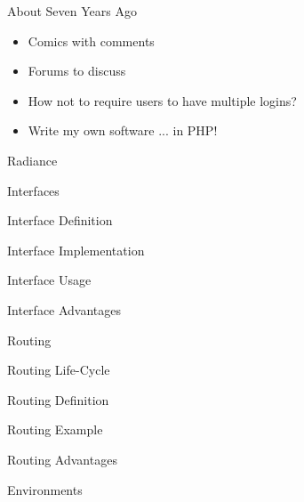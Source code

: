 \documentclass[14pt]{beamer}
\newcommand{\toptitle}[1]{
  {\huge #1} \\
  \vspace{0.2cm}
}
\begin{document}
\begin{frame}
  \toptitle{About Seven Years Ago}
  \begin{itemize}
  \item Comics with comments
  \item Forums to discuss
  \item How not to require users to have multiple logins?
    \pause
  \item Write my own software \pause ... in PHP!
  \end{itemize}
\end{frame}

\begin{frame}
  \toptitle{Radiance}
\end{frame}

\begin{frame}
  \toptitle{Interfaces}
\end{frame}

\begin{frame}
  \toptitle{Interface Definition}
\end{frame}

\begin{frame}
  \toptitle{Interface Implementation}
\end{frame}

\begin{frame}
  \toptitle{Interface Usage}
\end{frame}

\begin{frame}
  \toptitle{Interface Advantages}
\end{frame}

\begin{frame}
  \toptitle{Routing}
\end{frame}

\begin{frame}
  \toptitle{Routing Life-Cycle}
\end{frame}

\begin{frame}
  \toptitle{Routing Definition}
\end{frame}

\begin{frame}
  \toptitle{Routing Example}
\end{frame}

\begin{frame}
  \toptitle{Routing Advantages}
\end{frame}

\begin{frame}
  \toptitle{Environments}
\end{frame}
\end{document}
